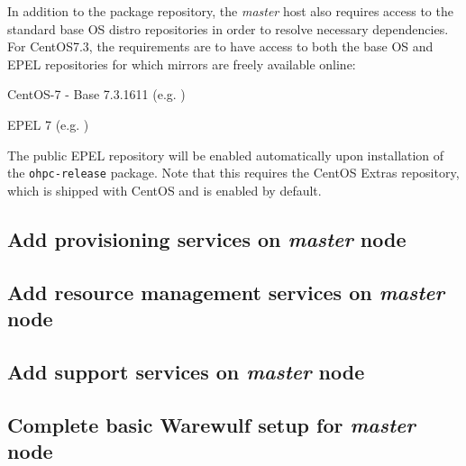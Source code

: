 \documentclass[letterpaper]{article}
\newcommand{\baseOS}{CentOS7.3}
\begin{document}
In addition to the \OHPC{} package repository, the {\em master} host also
requires access to the standard base OS distro repositories in order to resolve
necessary dependencies. For \baseOS{}, the requirements are to have access to
both the base OS and EPEL repositories for which mirrors are freely available online:

\begin{itemize*}
\item CentOS-7 - Base 7.3.1611
  (e.g. \href{http://mirror.centos.org/centos-7/7/os/x86\_64}
             {\color{blue}{http://mirror.centos.org/centos-7/7/os/x86\_64}} )
\item EPEL 7 (e.g. \href{http://download.fedoraproject.org/pub/epel/7/x86\_64}
                        {\color{blue}{http://download.fedoraproject.org/pub/epel/7/x86\_64}} )
\end{itemize*}

\noindent The public EPEL repository will be enabled automatically upon installation of the 
\texttt{ohpc-release} package. Note that this requires the CentOS Extras
repository, which is shipped with CentOS and is enabled by default.




\subsection{Add provisioning services on {\em master} node} \label{sec:add_provisioning}




\subsection{Add resource management services on {\em master} node} \label{sec:add_rm}


\subsection{Add \InfiniBand{} support services on {\em master} node} \label{sec:add_ofed}


\vspace*{-0.15cm}
\subsection{Complete basic Warewulf setup for {\em master} node} \label{sec:setup_ww}


\end{document}

